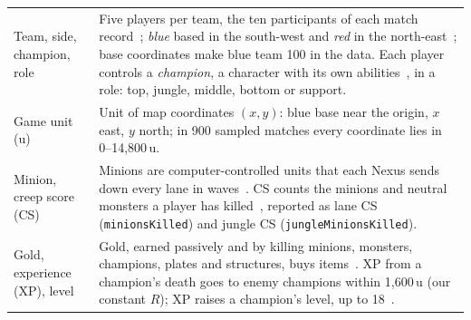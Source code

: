 \begin{table}[!t]
\begin{tabularx}{\textwidth}{@{}>{\raggedright\arraybackslash}p{2.35cm}X@{}}
Team, side, champion, role &
  Five players per team, the ten participants of each match record~\cite{riotapi2024matchv5}; \emph{blue}
  based in the south-west and \emph{red} in the
  north-east~\cite{lolwiki2025summonersrift}; base coordinates make blue team 100 in the data. Each player
  controls a \emph{champion}, a character with its own abilities~\cite{lolwiki2026champion}, in a role:
  top, jungle, middle, bottom or support. \\
Game unit (u) &
  Unit of map coordinates $(x, y)$: blue base near the origin, $x$ east, $y$ north; in 900 sampled
  matches every coordinate lies in 0--14,800\,u. \\
\midrule
Minion, creep score (CS) &
  Minions are computer-controlled units that each Nexus sends down every lane in
  waves~\cite{lolwiki2026minion}. CS counts the minions and neutral monsters a player has
  killed~\cite{lolwiki2026farming}, reported as lane CS (\texttt{minionsKilled}) and jungle CS
  (\texttt{jungleMinionsKilled}). \\
Gold, experience (XP), level &
  Gold, earned passively and by killing minions, monsters, champions, plates and structures, buys
  items~\cite{lolwiki2026gold}. XP from a champion's death goes to enemy champions within 1,600\,u (our
  constant $R$); XP raises a champion's level, up to 18~\cite{lolwiki2026experience}. \\

\end{tabularx}
\end{table}
